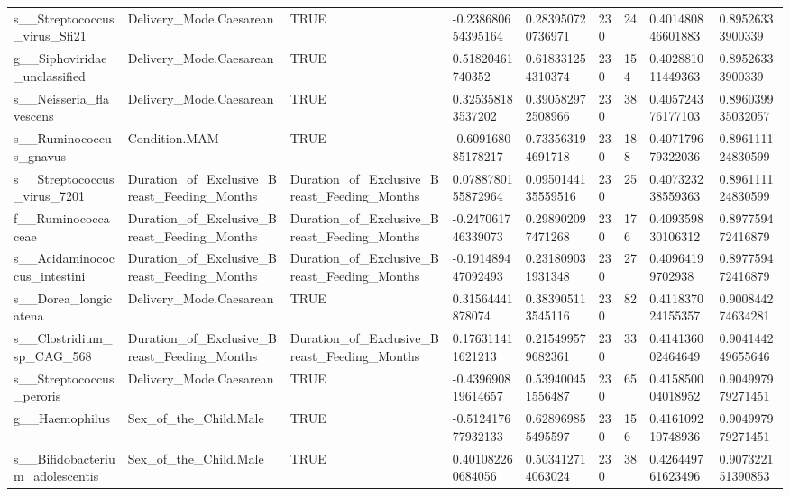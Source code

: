 \begin{longtable}{lllllllll}
s\_\_Streptococcus\_virus\_Sfi21 & Delivery\_Mode.Caesarean & TRUE & -0.238680654395164 & 0.283950720736971 & 230 & 24 & 0.401480846601883 & 0.89526333900339 \\
g\_\_Siphoviridae\_unclassified & Delivery\_Mode.Caesarean & TRUE & 0.51820461740352 & 0.618331254310374 & 230 & 154 & 0.402881011449363 & 0.89526333900339 \\
s\_\_Neisseria\_flavescens & Delivery\_Mode.Caesarean & TRUE & 0.325358183537202 & 0.390582972508966 & 230 & 38 & 0.405724376177103 & 0.896039935032057 \\
s\_\_Ruminococcus\_gnavus & Condition.MAM & TRUE & -0.609168085178217 & 0.733563194691718 & 230 & 188 & 0.407179679322036 & 0.896111124830599 \\
s\_\_Streptococcus\_virus\_7201 & Duration\_of\_Exclusive\_Breast\_Feeding\_Months & Duration\_of\_Exclusive\_Breast\_Feeding\_Months & 0.0788780155872964 & 0.0950144135559516 & 230 & 25 & 0.407323238559363 & 0.896111124830599 \\
f\_\_Ruminococcaceae & Duration\_of\_Exclusive\_Breast\_Feeding\_Months & Duration\_of\_Exclusive\_Breast\_Feeding\_Months & -0.247061746339073 & 0.298902097471268 & 230 & 176 & 0.409359830106312 & 0.897759472416879 \\
s\_\_Acidaminococcus\_intestini & Duration\_of\_Exclusive\_Breast\_Feeding\_Months & Duration\_of\_Exclusive\_Breast\_Feeding\_Months & -0.191489447092493 & 0.231809031931348 & 230 & 27 & 0.40964199702938 & 0.897759472416879 \\
s\_\_Dorea\_longicatena & Delivery\_Mode.Caesarean & TRUE & 0.31564441878074 & 0.383905113545116 & 230 & 82 & 0.411837024155357 & 0.900844274634281 \\
s\_\_Clostridium\_sp\_CAG\_568 & Duration\_of\_Exclusive\_Breast\_Feeding\_Months & Duration\_of\_Exclusive\_Breast\_Feeding\_Months & 0.176311411621213 & 0.215499579682361 & 230 & 33 & 0.414136002464649 & 0.904144249655646 \\
s\_\_Streptococcus\_peroris & Delivery\_Mode.Caesarean & TRUE & -0.439690819614657 & 0.539400451556487 & 230 & 65 & 0.415850004018952 & 0.904997979271451 \\
g\_\_Haemophilus & Sex\_of\_the\_Child.Male & TRUE & -0.512417677932133 & 0.628969855495597 & 230 & 156 & 0.416109210748936 & 0.904997979271451 \\
s\_\_Bifidobacterium\_adolescentis & Sex\_of\_the\_Child.Male & TRUE & 0.401082260684056 & 0.503412714063024 & 230 & 38 & 0.426449761623496 & 0.907322151390853 \\

\end{longtable}
